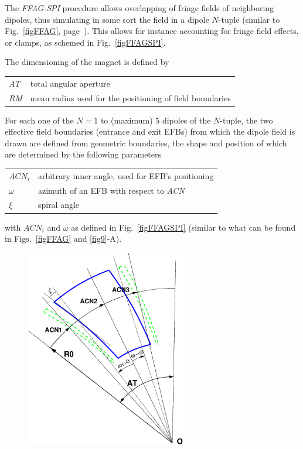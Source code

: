 \medskip

\noindent The \textsl{FFAG-SPI} procedure allows overlapping of fringe fields of neighboring dipoles, 
thus simulating in some sort the field in a dipole $N$-tuple  (similar to Fig.~\ref{figFFAG}, page~\pageref{figFFAG}).
This allows  for instance accounting for fringe field effects, or clamps, as schemed in 
Fig.~\ref{figFFAGSPI}. 

\medskip

\noindent  The dimensioning of the magnet is defined by

\medskip

 \begin{tabular}{>{\sl}l!{~:}l}
	 AT &  total angular aperture \\
	 RM & mean radius used for the positioning of field boundaries\\
 \end{tabular}

\medskip

\noindent For each one of the $N=1$ to (maximum) $5$ dipoles of the  $N$-tuple, 
the two  effective field boundaries (entrance and exit EFBs) from which  the dipole field  is drawn are
defined from geometric boundaries, the shape and position of which are determined by the 
following parameters 

\medskip

\begin{tabular}{l!{~:}l}
	$ACN_i$  & arbitrary inner angle, used for EFB's positioning  \\
	$\omega$ &  azimuth of an EFB with respect to  \textsl{ACN}\\
	$\xi$ & spiral angle \\
\end{tabular}

\medskip

\noindent with $ACN_i$ and $\omega$ as defined in Fig.~\ref{figFFAGSPI} 
(similar to what can be found in Figs.~\ref{figFFAG} and \ref{fig9}-A). 

\begin{figure}[h]
\centerline{\includegraphics[width=7cm]{figFFAGSPI.eps}  }
{\setlength{\captionwidth}{12cm}
 }
\end{figure}


